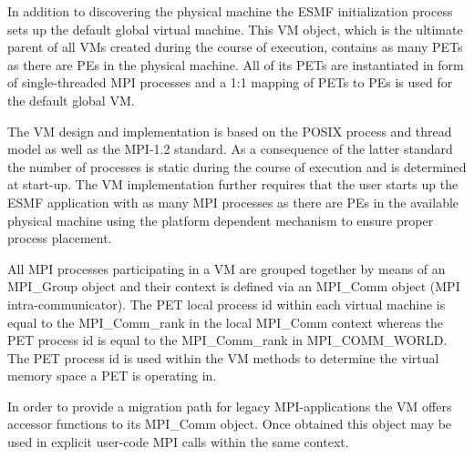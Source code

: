In addition to discovering the physical machine the ESMF initialization process sets up the default global virtual machine. This VM object, which is the ultimate parent of all VMs created during the course of execution, contains as many PETs as there are PEs in the physical machine. All of its PETs are instantiated in form of single-threaded MPI processes and a 1:1 mapping of PETs to PEs is used for the default global VM.

The VM design and implementation is based on the POSIX process and thread model as well as the MPI-1.2 standard. As a consequence of the latter standard the number of processes is static during the course of execution and is determined at start-up. The VM implementation further requires that the user starts up the ESMF application with as many MPI processes as there are PEs in the available physical machine using the platform dependent mechanism to ensure proper process placement. 

All MPI processes participating in a VM are grouped together by means of an MPI\_Group object and their context is defined via an MPI\_Comm object (MPI intra-communicator). The PET local process id within each virtual machine is equal to the MPI\_Comm\_rank in the local MPI\_Comm context whereas the PET process id is equal to the MPI\_Comm\_rank in MPI\_COMM\_WORLD. The PET process id is used within the VM methods to determine the virtual memory space a PET is operating in. 

In order to provide a migration path for legacy MPI-applications the VM offers accessor functions to its MPI\_Comm object. Once obtained this object may be used in explicit user-code MPI calls within the same context.
